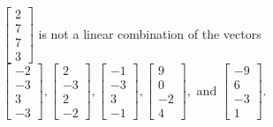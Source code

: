 \begin{exercise}
\begin{exerciseStatement}
  \end{exerciseStatement}
  \begin{exerciseAnswer}
   \(\left[\begin{array}{c}
2 \\
7 \\
7 \\
3
\end{array}\right]\) 
  	 is not  
	a linear combination of the vectors \(\left[\begin{array}{c}
-2 \\
-3 \\
3 \\
-3
\end{array}\right] , \left[\begin{array}{c}
2 \\
-3 \\
2 \\
-2
\end{array}\right] , \left[\begin{array}{c}
-1 \\
-3 \\
3 \\
-1
\end{array}\right] , \left[\begin{array}{c}
9 \\
0 \\
-2 \\
4
\end{array}\right] , \text{ and } \left[\begin{array}{c}
-9 \\
6 \\
-3 \\
1
\end{array}\right]\).

	
  


  \end{exerciseAnswer}
\end{exercise}
